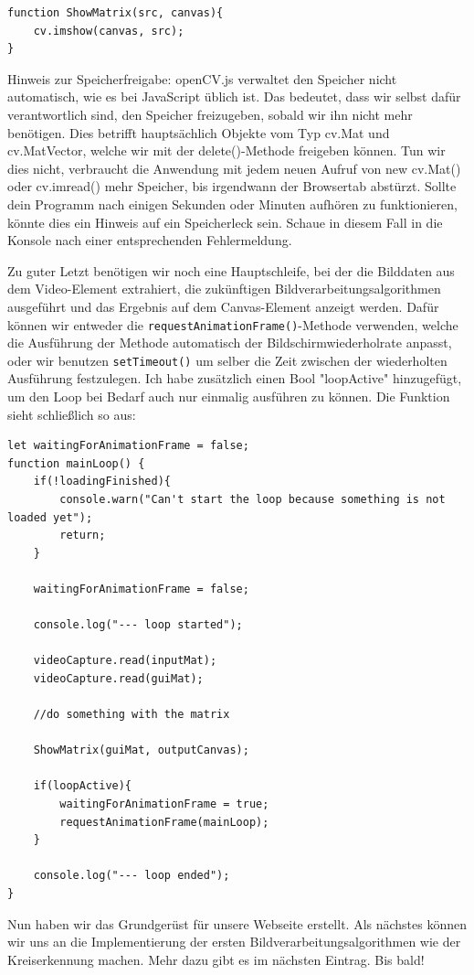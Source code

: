 \begin{lstlisting}[style=JavaScript]
function ShowMatrix(src, canvas){
    cv.imshow(canvas, src);
}
\end{lstlisting}

Hinweis zur Speicherfreigabe: openCV.js verwaltet den Speicher nicht automatisch, wie es bei \mbox{JavaScript} üblich ist. Das bedeutet, dass wir selbst dafür verantwortlich sind, den Speicher freizugeben, sobald wir ihn nicht mehr benötigen. Dies betrifft hauptsächlich Objekte vom Typ cv.Mat und cv.MatVector, welche wir mit der delete()-Methode freigeben können. Tun wir dies nicht, verbraucht die Anwendung mit jedem neuen Aufruf von new cv.Mat() oder cv.imread() mehr Speicher, bis irgendwann der Browsertab abstürzt. Sollte dein Programm nach einigen Sekunden oder Minuten aufhören zu funktionieren, könnte dies ein Hinweis auf ein Speicherleck sein. Schaue in diesem Fall in die Konsole nach einer entsprechenden Fehlermeldung.

Zu guter Letzt benötigen wir noch eine Hauptschleife, bei der die Bilddaten aus dem Video-Element extrahiert, die zukünftigen Bildverarbeitungsalgorithmen ausgeführt und das Ergebnis auf dem Canvas-Element anzeigt werden. Dafür können wir entweder die \texttt{requestAnimationFrame()}-Methode verwenden, welche die Ausführung der Methode automatisch der Bildschirmwiederholrate anpasst, oder wir benutzen \texttt{setTimeout()} um selber die Zeit zwischen der wiederholten Ausführung festzulegen. Ich habe zusätzlich einen Bool "loopActive" hinzugefügt, um den Loop bei Bedarf auch nur einmalig ausführen zu können. Die Funktion sieht schließlich so aus:

\begin{lstlisting}[style=JavaScript]
let waitingForAnimationFrame = false;
function mainLoop() {
    if(!loadingFinished){
        console.warn("Can't start the loop because something is not loaded yet");
        return;
    }

    waitingForAnimationFrame = false;

    console.log("--- loop started");

    videoCapture.read(inputMat);
    videoCapture.read(guiMat);

    //do something with the matrix
    
    ShowMatrix(guiMat, outputCanvas);

    if(loopActive){
        waitingForAnimationFrame = true;
        requestAnimationFrame(mainLoop);
    }

    console.log("--- loop ended");
}
\end{lstlisting}

Nun haben wir das Grundgerüst für unsere Webseite erstellt. Als nächstes können wir uns an die Implementierung der ersten Bildverarbeitungsalgorithmen wie der Kreiserkennung machen. Mehr dazu gibt es im nächsten Eintrag. Bis bald!
